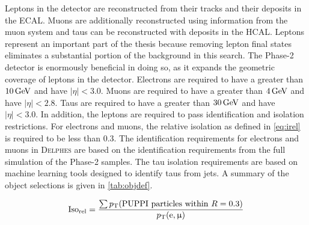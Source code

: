 Leptons in the detector are reconstructed from their tracks and their deposits in the ECAL. Muons are additionally reconstructed using information from the muon system and taus can be reconstructed with deposits in the HCAL. Leptons represent an important part of the thesis because removing lepton final states eliminates a substantial portion of the background in this search. The Phase-2 detector is enormously beneficial in doing so, as it expands the geometric coverage of leptons in the detector. Electrons are required to have a \pt greater than $\GeV{10}$ and have $|\eta| < 3.0$. Muons are required to have a \pt greater than $\GeV{4}$ and have $|\eta| < 2.8$. Taus are required to have a \pt greater than $\GeV{30}$ and have $|\eta| < 3.0$. In addition, the leptons are required to pass identification and isolation restrictions. For electrons and muons, the relative isolation as defined in \cref{eq:irel} is required to be less than 0.3. The identification requirements for electrons and muons in \textsc{Delphes} are based on the identification requirements from the full simulation of the Phase-2 samples. The tau isolation requirements are based on machine learning tools designed to identify taus from jets. A summary of the object selections is given in \cref{tab:objdef}.

\begin{equation}
    \text{Iso}_{\text{rel}} = \frac{\sum p_\mathrm{T}(\text{PUPPI particles within } R=0.3)}{p_\mathrm{T}(\mathrm{e}, \upmu)}
    \label{eq:irel}
\end{equation}


 
